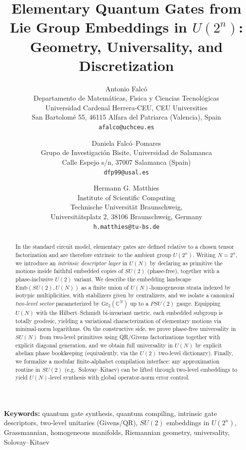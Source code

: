 \documentclass{article}%
\title{Elementary Quantum Gates from Lie Group Embeddings in \texorpdfstring{$U(2^n)$}{U(2^n)}: Geometry, Universality, and Discretization}
\author{%
Antonio Falc\'o\\
Departamento de Matem\'aticas, F\'{\i}sica y Ciencias Tecnol\'ogicas\\
Universidad Cardenal Herrera-CEU, CEU Universities\\
San Bartolom\'e 55, 46115 Alfara del Patriarca (Valencia), Spain\\
\texttt{afalco@uchceu.es}
\and
Daniela Falc\'o--Pomares\\
Grupo de Investigaci\'on Bisite, Universidad de Salamanca\\
Calle Espejo s/n, 37007 Salamanca (Spain)\\
\texttt{dfp99@usal.es}
\and
Hermann G. Matthies\\
Institute of Scientific Computing\\
Technische Universit\"at Braunschweig, \\ 
Universit\"atsplatz 2, 38106 Braunschweig, Germany\\
\texttt{h.matthies@tu-bs.de}
}
\theoremstyle{definition}
\numberwithin{equation}{section}
\newcommand{\keywords}[1]{\par\noindent\textbf{Keywords:} #1}
\newcommand{\C}{\mathbb{C}}
\newcommand{\Gr}{\mathrm{Gr}}
\newcommand{\Emb}{\mathrm{Emb}}
\begin{document}





\maketitle

\begin{abstract}
In the standard circuit model, elementary gates are defined relative to a chosen tensor factorization and are therefore
extrinsic to the ambient group $U(2^n)$. Writing $N=2^n$, we introduce an \emph{intrinsic descriptor layer} in $U(N)$ by declaring as
primitive the motions inside faithful embedded copies of $SU(2)$ (phase-free), together with a phase-inclusive $U(2)$ variant.
We describe the embedding landscape $\Emb(SU(2),U(N))$ as a finite union of $U(N)$-homogeneous strata indexed by isotypic multiplicities,
with stabilizers given by centralizers, and we isolate a canonical \emph{two-level sector} parameterized by $\Gr_2(\C^N)$ up to a $PSU(2)$
gauge.
Equipping $U(N)$ with the Hilbert--Schmidt bi-invariant metric, each embedded subgroup is totally geodesic, yielding a variational
characterization of elementary motions via minimal-norm logarithms.
On the constructive side, we prove phase-free universality in $SU(N)$ from two-level primitives using QR/Givens factorizations together with
explicit diagonal generation, and we obtain full universality in $U(N)$ by explicit abelian phase bookkeeping (equivalently, via the $U(2)$
two-level dictionary).
Finally, we formalize a modular finite-alphabet compilation interface: any approximation routine in $SU(2)$ (e.g.\ Solovay--Kitaev) can be
lifted through two-level embeddings to yield $U(N)$-level synthesis with global operator-norm error control.
\end{abstract}

\keywords{quantum gate synthesis, quantum compiling, intrinsic gate descriptors, two-level unitaries (Givens/QR), $SU(2)$ embeddings in $U(2^n)$, Grassmannian, homogeneous manifolds, Riemannian geometry, universality, Solovay--Kitaev}




\end{document}
